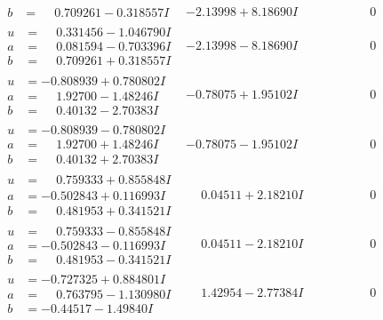 \documentclass[1p]{elsarticle_modified}
\theoremstyle{definition}
\begin{document}
$$\begin{array}{c|c|c}
\begin{aligned}
b &= \phantom{-}0.709261 - 0.318557 I\end{aligned}
 & -2.13998 + 8.18690 I & \phantom{-0.000000 } 0 \\ \hline\begin{aligned}
u &= \phantom{-}0.331456 - 1.046790 I \\
a &= \phantom{-}0.081594 - 0.703396 I \\
b &= \phantom{-}0.709261 + 0.318557 I\end{aligned}
 & -2.13998 - 8.18690 I & \phantom{-0.000000 } 0 \\ \hline\begin{aligned}
u &= -0.808939 + 0.780802 I \\
a &= \phantom{-}1.92700 - 1.48246 I \\
b &= \phantom{-}0.40132 - 2.70383 I\end{aligned}
 & -0.78075 + 1.95102 I & \phantom{-0.000000 } 0 \\ \hline\begin{aligned}
u &= -0.808939 - 0.780802 I \\
a &= \phantom{-}1.92700 + 1.48246 I \\
b &= \phantom{-}0.40132 + 2.70383 I\end{aligned}
 & -0.78075 - 1.95102 I & \phantom{-0.000000 } 0 \\ \hline\begin{aligned}
u &= \phantom{-}0.759333 + 0.855848 I \\
a &= -0.502843 + 0.116993 I \\
b &= \phantom{-}0.481953 + 0.341521 I\end{aligned}
 & \phantom{-}0.04511 + 2.18210 I & \phantom{-0.000000 } 0 \\ \hline\begin{aligned}
u &= \phantom{-}0.759333 - 0.855848 I \\
a &= -0.502843 - 0.116993 I \\
b &= \phantom{-}0.481953 - 0.341521 I\end{aligned}
 & \phantom{-}0.04511 - 2.18210 I & \phantom{-0.000000 } 0 \\ \hline\begin{aligned}
u &= -0.727325 + 0.884801 I \\
a &= \phantom{-}0.763795 - 1.130980 I \\
b &= -0.44517 - 1.49840 I\end{aligned}
 & \phantom{-}1.42954 - 2.77384 I & \phantom{-0.000000 } 0 \\ \hline\begin{aligned}

\end{aligned}
\end{array}$$
\end{document}
